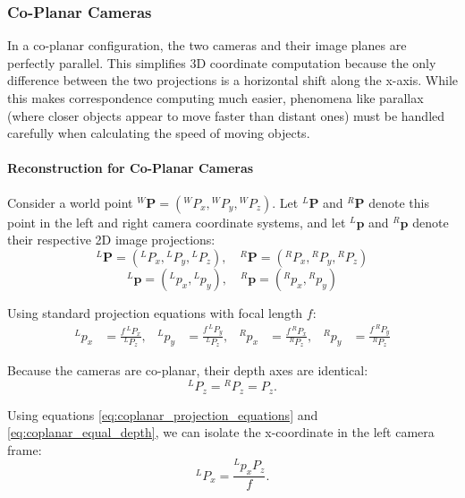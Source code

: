 \subsubsection{Co-Planar Cameras}
In a co-planar configuration, the two cameras and their image planes are perfectly parallel. 
This simplifies 3D coordinate computation because the only difference between the two projections is a horizontal shift along the x-axis. 
While this makes correspondence computing much easier, phenomena like parallax (where closer objects appear to move faster than distant ones) 
must be handled carefully when calculating the speed of moving objects.

\paragraph{Reconstruction for Co-Planar Cameras}
\begin{figure}[H]
    \centering
    \resizebox{\linewidth}{!}{}
\end{figure}

Consider a world point ${}^{W}\boldsymbol{P}=({}^{W}P_x, {}^{W}P_y, {}^{W}P_z)$.
Let ${}^{L}\boldsymbol{P}$ and ${}^{R}\boldsymbol{P}$ denote this point in the left and right camera coordinate systems, and let ${}^{L}\boldsymbol{p}$ and ${}^{R}\boldsymbol{p}$ denote their respective 2D image projections:
\[
{}^{L}\boldsymbol{P}=({}^{L}P_x, {}^{L}P_y, {}^{L}P_z), \quad
{}^{R}\boldsymbol{P}=({}^{R}P_x, {}^{R}P_y, {}^{R}P_z)
\]
\[
{}^{L}\boldsymbol{p}=({}^{L}p_x, {}^{L}p_y), \quad
{}^{R}\boldsymbol{p}=({}^{R}p_x, {}^{R}p_y)
\]

Using standard projection equations with focal length $f$:
\begin{equation}
    \begin{aligned}
        {}^{L}p_x &= \frac{f\,{}^{L}P_x}{{}^{L}P_z}, &
        {}^{L}p_y &= \frac{f\,{}^{L}P_y}{{}^{L}P_z}, &
        {}^{R}p_x &= \frac{f\,{}^{R}P_x}{{}^{R}P_z}, &
        {}^{R}p_y &= \frac{f\,{}^{R}P_y}{{}^{R}P_z}
    \end{aligned}
    \label{eq:coplanar_projection_equations}
\end{equation}

Because the cameras are co-planar, their depth axes are identical:
\begin{equation}
    {}^{L}P_z = {}^{R}P_z = P_z.
    \label{eq:coplanar_equal_depth}
\end{equation}

Using equations \ref{eq:coplanar_projection_equations} and \ref{eq:coplanar_equal_depth}, we can isolate the x-coordinate in the left camera frame:
\begin{equation}
    {}^{L}P_x = \frac{{}^{L}p_x P_z}{f}.
    \label{eq:left_x_from_projection}
\end{equation}

